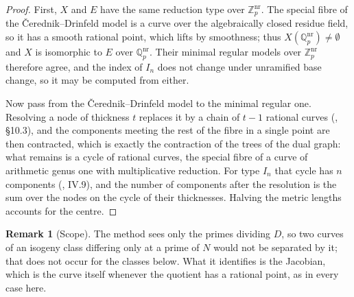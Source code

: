 \documentclass[11pt,reqno]{amsart}
\theoremstyle{plain}
\theoremstyle{definition}
\newtheorem{remark}[theorem]{Remark}
\newcommand{\Q}{\mathbb{Q}}
\newcommand{\Z}{\mathbb{Z}}
\begin{document}
\begin{proof}
First, $X$ and $E$ have the same reduction type over $\Z_p^{\mathrm{nr}}$. The special fibre of the
Čerednik--Drinfeld model is a curve over the algebraically closed residue field, so it has a smooth
rational point, which lifts by smoothness; thus $X(\Q_p^{\mathrm{nr}}) \neq \emptyset$ and $X$ is
isomorphic to $E$ over $\Q_p^{\mathrm{nr}}$. Their minimal regular models over
$\Z_p^{\mathrm{nr}}$ therefore agree, and the index of $I_n$ does not change under unramified base
change, so it may be computed from either.

Now pass from the Čerednik--Drinfeld model to the minimal regular one. Resolving a node of
thickness $t$ replaces it by a chain of $t - 1$ rational curves (\cite{Liu}, \S10.3), and the
components meeting the rest of the fibre in a single point are then contracted, which is exactly
the contraction of the trees of the dual graph: what remains is a cycle of rational curves, the
special fibre of a curve of arithmetic genus one with multiplicative reduction. For type $I_n$ that
cycle has $n$ components (\cite{Si}, IV.9), and the number of components after the resolution is the
sum over the nodes on the cycle of their thicknesses. Halving the metric lengths accounts for the
centre.
\end{proof}

\begin{remark}[Scope]\label{rem:scope}
The method sees only the primes dividing $D$, so two curves of an isogeny class differing only at a
prime of $N$ would not be separated by it; that does not occur for the classes below. What it
identifies is the Jacobian, which is the curve itself whenever the quotient has a rational point, as
in every case here.
\end{remark}
\end{document}
